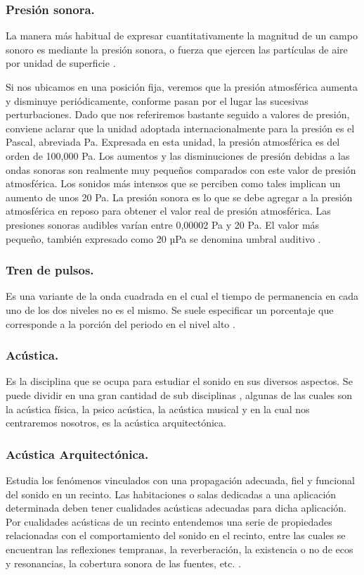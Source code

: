 \subsubsection{Presión sonora.} La manera más habitual de expresar cuantitativamente la magnitud de un campo sonoro es mediante la presión sonora, o fuerza que ejercen las partículas de aire por unidad de superficie \cite{Isbert1998}.

Si nos ubicamos en una posición fija, veremos que la presión atmosférica aumenta y disminuye periódicamente, conforme pasan por el lugar las sucesivas perturbaciones. Dado que nos referiremos bastante seguido a valores de presión, conviene aclarar que la unidad adoptada internacionalmente para la presión es el Pascal, abreviada Pa. Expresada en esta unidad, la presión atmosférica es del orden de 100,000 Pa. Los aumentos y las disminuciones de presión debidas a las ondas sonoras son realmente muy pequeños comparados con este valor de presión atmosférica. Los sonidos más intensos que se perciben como tales implican un aumento de unos 20 Pa. La presión sonora es lo que se debe agregar a la presión atmosférica en reposo para obtener el valor real de presión atmosférica. Las presiones sonoras audibles varían entre 0,00002 Pa y 20 Pa. El valor más pequeño, también expresado como 20 µPa se denomina umbral auditivo \cite{Miyara2004}. 

\subsubsection{Tren de pulsos.} Es una variante de la onda cuadrada en el cual el tiempo de permanencia en cada uno de los dos niveles no es el mismo. Se suele especificar un porcentaje que corresponde a la porción del periodo en el nivel alto \cite{Miyara2004}.

\subsubsection{Acústica.} Es la disciplina que se ocupa para estudiar el sonido en sus diversos aspectos. Se puede dividir en una gran cantidad de sub disciplinas \cite{Miyara2004}, algunas de las cuales son la acústica física, la psico acústica, la acústica musical y en la cual nos centraremos nosotros, es la acústica arquitectónica. 

\subsubsection{Acústica Arquitectónica.} Estudia los fenómenos vinculados con una propagación adecuada, fiel y funcional del sonido en un recinto. Las habitaciones o salas dedicadas a una aplicación determinada deben tener cualidades acústicas adecuadas para dicha aplicación. Por cualidades acústicas de un recinto entendemos una serie de propiedades relacionadas con el comportamiento del sonido en el recinto, entre las cuales se encuentran las reflexiones tempranas, la reverberación, la existencia o no de ecos y resonancias, la cobertura sonora de las fuentes, etc. \cite{Miyara2004}.

